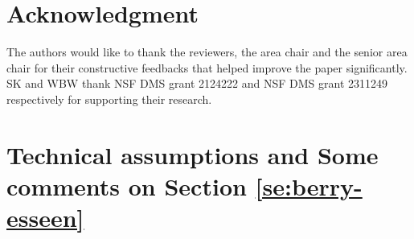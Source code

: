 \documentclass[a4paper,11pt]{article}
\numberwithin{equation}{section}
\theoremstyle{plain}
\theoremstyle{remark}
\begin{document}
\section{Acknowledgment}
 The authors would like to thank the reviewers, the area chair and the senior area chair for their constructive feedbacks that helped improve the paper significantly. SK and WBW thank NSF DMS grant 2124222 and NSF DMS grant 2311249 respectively for supporting their research.




\newpage 
\section{Technical assumptions and Some comments on Section \ref{se:berry-esseen}} \label{se:assumption}
\end{document}
